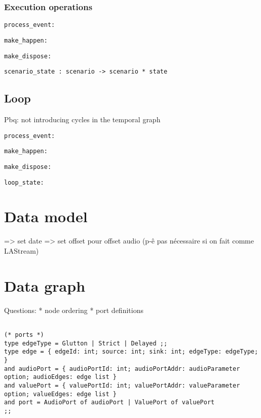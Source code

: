 \documentclass[applsci,article,submit,moreauthors,pdftex,10pt,a4paper]{mdpi}
\begin{document}
\subsubsection{Execution operations}

\begin{lstlisting}
process_event:
\end{lstlisting}
\begin{lstlisting}
make_happen:
\end{lstlisting}
\begin{lstlisting}
make_dispose:
\end{lstlisting}

\begin{lstlisting}
scenario_state : scenario -> scenario * state
\end{lstlisting}

\subsection{Loop}\label{sec.loop}
Pbq: not introducing cycles in the temporal graph
\begin{lstlisting}
process_event:
\end{lstlisting}
\begin{lstlisting}
make_happen:
\end{lstlisting}
\begin{lstlisting}
make_dispose:
\end{lstlisting}
\begin{lstlisting}
loop_state:
\end{lstlisting}
\section{Data model}\label{sec.datamodel}
=> set date
=> set offset pour offset audio (p-ê pas nécessaire si on fait comme LAStream)

\section{Data graph}
Questions: 
* node ordering
* port definitions

\begin{lstlisting}

(* ports *)
type edgeType = Glutton | Strict | Delayed ;;
type edge = { edgeId: int; source: int; sink: int; edgeType: edgeType; } 
and audioPort = { audioPortId: int; audioPortAddr: audioParameter option; audioEdges: edge list } 
and valuePort = { valuePortId: int; valuePortAddr: valueParameter option; valueEdges: edge list } 
and port = AudioPort of audioPort | ValuePort of valuePort
;;

\end{lstlisting}
\end{document}
